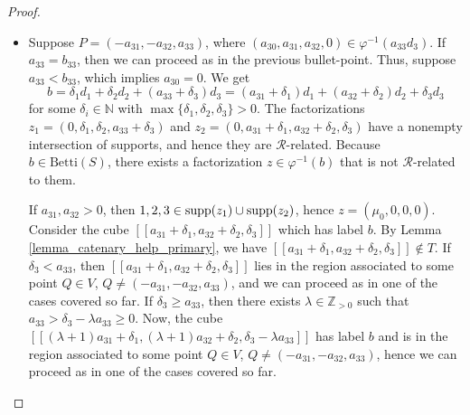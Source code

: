 \documentclass[12pt]{article}
\theoremstyle{remark}
\begin{document}
\begin{proof}
\begin{itemize}
        If $b_{12}=0, b_{13} > 0$, we proceed analogously as above.
        
        
        If $b_{12} = b_{13} = 0$, then $P = (b_{11},0,0)$ and $b_{10} \geq a_{00}$. If $b_{10} = a_{00}$, then we are in the case $P = (a_{01},a_{02},a_{03})$ and we can proceed analogously as there. If $b_{10} > a_{00}$, then $(b_{10}-a_{00},a_{01},a_{02},a_{03}) \in \varphi^{-1}(b_{11}d_1)$ with $\max \{a_{01},a_{02},a_{03}\}>0$. If $a_{01} > 0$, we get a contradiction with the minimality of $b_{11}$ (since $(b_{10}-a_{00})>0$). Hence $(b_{10}-a_{00},0,a_{02},a_{03}) \in \varphi^{-1}(b_{11}d_1)$ where $(b_{10}-a_{00})>0$ and $\max \{a_{02},a_{03}\} > 0$. Therefore we can replace $P = (b_{11},0,0)$ with $(b_{11},-a_{02},-a_{03})$ and proceed as in the previous cases of this bullet-point.

        The case $P = (-b_{21},b_{22},-b_{23})$ follows analogously.
        
        

    \item   Suppose $P =(-a_{31},-a_{32},a_{33})$, where $(a_{30},a_{31},a_{32},0) \in \varphi^{-1}(a_{33}d_3)$. If $a_{33}=b_{33}$, then we can proceed as in the previous bullet-point. Thus, suppose $a_{33}<b_{33}$, which implies $a_{30} = 0$. We get
    \begin{equation}
        b = \delta_1d_1 +   \delta_2d_2 + (a_{33} +\delta_3)d_3  =  (a_{31}+\delta_1)d_1+ (a_{32}+\delta_2)d_2 + \delta_3d_3
    \end{equation}
    for some $\delta_i \in \mathbb{N}$ with $\max \{\delta_1,\delta_2,\delta_3\} > 0$. The factorizations $z_1 =(0,\delta_1,\delta_2,a_{33} +\delta_3)$ and $z_2 =(0,a_{31}+\delta_1,a_{32}+\delta_2,\delta_3)$ have a nonempty intersection of supports, and hence they are $\mathcal{R}$-related. Because $b \in \text{Betti}(S)$, there exists a factorization $z \in \varphi^{-1}(b)$ that is not $\mathcal{R}$-related to them. 
        
    If $a_{31},a_{32}>0$, then $1,2,3 \in \textup{supp}(z_1) \cup \textup{supp}(z_2)$, hence $z = (\mu_0,0,0,0)$. Consider the cube $[[a_{31}+\delta_1,a_{32}+\delta_2,\delta_3]]$ which has label $b$. By Lemma \ref{lemma_catenary_help_primary}, we have $[[a_{31}+\delta_1,a_{32}+\delta_2,\delta_3]] \notin T$. If $\delta_3 < a_{33}$, then $[[a_{31}+\delta_1,a_{32}+\delta_2,\delta_3]]$ lies in the region associated to some point $Q \in V$, $Q \neq (-a_{31},-a_{32},a_{33})$, and we can proceed as in one of the cases covered so far. If $\delta_3 \geq a_{33}$, then there exists $\lambda \in \mathbb{Z}_{>0}$ such that $a_{33} >\delta_3 - \lambda a_{33} \geq 0$. Now, the cube $[[ (\lambda+1)a_{31}+\delta_1,(\lambda+1)a_{32}+\delta_2,\delta_3 - \lambda a_{33}]]$ has label $b$ and is in the region associated to some point $Q \in V$, $Q \neq (-a_{31},-a_{32},a_{33})$, hence we can proceed as in one of the cases covered so far.


\end{itemize}
\end{proof}
\end{document}
